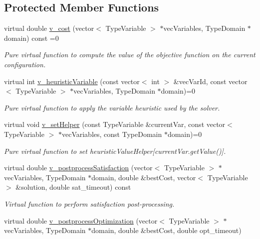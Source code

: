\subsection*{Protected Member Functions}
\begin{DoxyCompactItemize}
\item 
virtual double \hyperlink{classghost_1_1Objective_a401aa21f01c1e01d34e34893766f3e9d}{v\-\_\-cost} (vector$<$ Type\-Variable $>$ $\ast$vec\-Variables, Type\-Domain $\ast$domain) const =0
\begin{DoxyCompactList}\small\item\em Pure virtual function to compute the value of the objective function on the current configuration. \end{DoxyCompactList}\item 
virtual int \hyperlink{classghost_1_1Objective_ae4a49d23569c367182f934c25a6c6103}{v\-\_\-heuristic\-Variable} (const vector$<$ int $>$ \&vec\-Var\-Id, const vector$<$ Type\-Variable $>$ $\ast$vec\-Variables, Type\-Domain $\ast$domain)=0
\begin{DoxyCompactList}\small\item\em Pure virtual function to apply the variable heuristic used by the solver. \end{DoxyCompactList}\item 
virtual void \hyperlink{classghost_1_1Objective_a8c4efc1602123b28626a37c53e100a6e}{v\-\_\-set\-Helper} (const Type\-Variable \&current\-Var, const vector$<$ Type\-Variable $>$ $\ast$vec\-Variables, const Type\-Domain $\ast$domain)=0
\begin{DoxyCompactList}\small\item\em Pure virtual function to set heuristic\-Value\-Helper\mbox{[}current\-Var.\-get\-Value()\mbox{]}. \end{DoxyCompactList}\item 
virtual double \hyperlink{classghost_1_1Objective_a5f2b324e82efdbdb27528a2915fa14e2}{v\-\_\-postprocess\-Satisfaction} (vector$<$ Type\-Variable $>$ $\ast$vec\-Variables, Type\-Domain $\ast$domain, double \&best\-Cost, vector$<$ Type\-Variable $>$ \&solution, double sat\-\_\-timeout) const 
\begin{DoxyCompactList}\small\item\em Virtual function to perform satisfaction post-\/processing. \end{DoxyCompactList}\item 
virtual double \hyperlink{classghost_1_1Objective_af54dd3c4c9e4115534e25f27b7ccb32f}{v\-\_\-postprocess\-Optimization} (vector$<$ Type\-Variable $>$ $\ast$vec\-Variables, Type\-Domain $\ast$domain, double \&best\-Cost, double opt\-\_\-timeout)

\end{DoxyCompactItemize}
